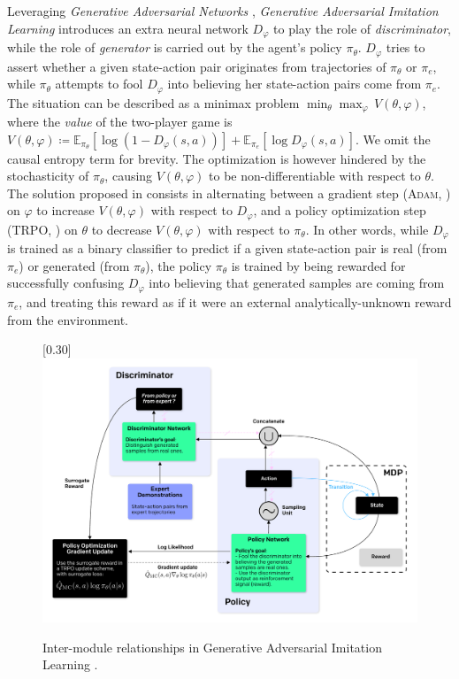 Leveraging \textit{Generative Adversarial Networks} \cite{Goodfellow2014-yk},
\textit{Generative Adversarial Imitation Learning} \cite{Ho2016-bv}
introduces an extra neural network $D_\varphi$
to play the role of \textit{discriminator}, while the role of
\textit{generator} is carried out by the agent's policy $\pi_\theta$.
$D_\varphi$ tries to assert whether a given state-action pair
originates from trajectories of $\pi_\theta$ or $\pi_e$, while $\pi_\theta$
attempts to fool $D_\varphi$ into believing her state-action pairs come from
$\pi_e$.
The situation can be described as a minimax problem
$\min_\theta \max_\varphi \, V(\theta, \varphi)$, where
the \textit{value} of the two-player game is
$V(\theta, \varphi) \coloneqq
\mathbb{E}_{\pi_\theta}[\log (1 - D_\varphi(s, a))]
+ \mathbb{E}_{\pi_e}[\log D_\varphi(s, a)]$.
We omit the causal entropy term for brevity.
The optimization is however hindered by the stochasticity
of $\pi_\theta$,
causing $V(\theta, \varphi)$ to be non-differentiable with respect to $\theta$.
The solution proposed in \cite{Ho2016-bv} consists in alternating between a
gradient step (\textsc{Adam}, \cite{Kingma2014-op}) on $\varphi$ to increase
$V(\theta, \varphi)$ with respect to $D_\varphi$, and a policy optimization step
(TRPO, \cite{Schulman2015-jt}) on $\theta$ to decrease $V(\theta, \varphi)$ with
respect to $\pi_\theta$.
In other words, while $D_\varphi$ is trained as a binary classifier to predict if
a given state-action pair is real (from $\pi_e$) or generated (from
$\pi_\theta$), the policy $\pi_\theta$ is trained by being rewarded for
successfully confusing $D_\varphi$ into believing that generated samples are coming
from $\pi_e$, and treating this reward as if it were an external
analytically-unknown reward from the environment.

\begin{figure}[h!]
\center
\scalebox{0.30}[0.30]{\includegraphics{Diags/gail_big}}
\caption{Inter-module relationships in
Generative Adversarial Imitation Learning \cite{Ho2016-bv}.}
\label{fig:gail_big}
\end{figure}

